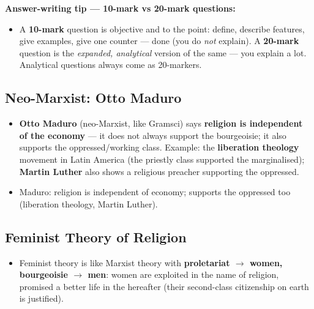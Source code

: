 \begin{CriticalPoint}
\textbf{Answer-writing tip --- 10-mark vs 20-mark questions:}
\begin{itemize}
\item A \textbf{10-mark} question is objective and to the point: define, describe features, give examples, give one counter --- done (you do \textit{not} explain). A \textbf{20-mark} question is the \textit{expanded, analytical} version of the same --- you explain a lot. Analytical questions always come as 20-markers.
\end{itemize}
\end{CriticalPoint}

\subsection{Neo-Marxist: Otto Maduro}

\begin{KeyConcept}
\begin{itemize}
\item \textbf{Otto Maduro} (neo-Marxist, like Gramsci) says \textbf{religion is independent of the economy} --- it does not always support the bourgeoisie; it also supports the oppressed/working class. Example: the \textbf{liberation theology} movement in Latin America (the priestly class supported the marginalised); \textbf{Martin Luther} also shows a religious preacher supporting the oppressed.
\end{itemize}
\end{KeyConcept}

\begin{QuickRevision}
\begin{itemize}
\item Maduro: religion is independent of economy; supports the oppressed too (liberation theology, Martin Luther).
\end{itemize}
\end{QuickRevision}

\sectiondivider

\subsection{Feminist Theory of Religion}

\begin{KeyConcept}
\begin{itemize}
\item Feminist theory is like Marxist theory with \textbf{proletariat $\rightarrow$ women, bourgeoisie $\rightarrow$ men}: women are exploited in the name of religion, promised a better life in the hereafter (their second-class citizenship on earth is justified).
\end{itemize}
\end{KeyConcept}

